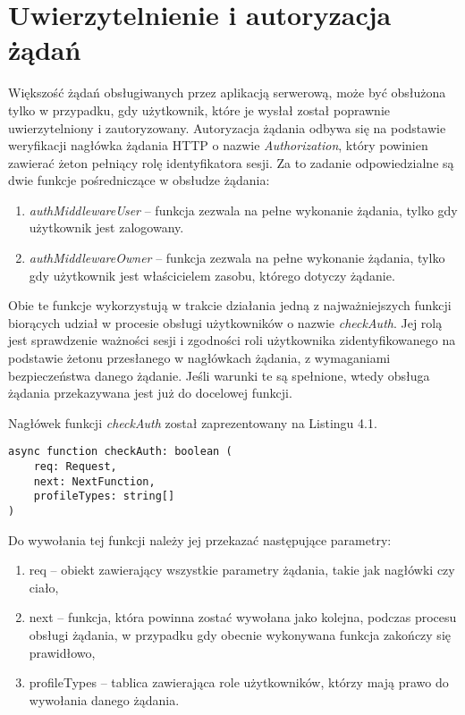 \documentclass[a4paper,12pt,twoside,openany]{report}
\begin{document}
\section{Uwierzytelnienie i autoryzacja żądań}
Większość żądań obsługiwanych przez aplikacją serwerową, może być obsłużona tylko w przypadku, gdy użytkownik, które je wysłał został poprawnie uwierzytelniony i zautoryzowany. 
Autoryzacja żądania odbywa się na podstawie weryfikacji nagłówka żądania HTTP o nazwie \textit{Authorization}, który powinien zawierać żeton pełniący rolę identyfikatora sesji. Za to zadanie odpowiedzialne są dwie funkcje pośredniczące w obsłudze żądania: 
\begin{enumerate}
	
	\item \textit{authMiddlewareUser} -- funkcja zezwala na pełne wykonanie żądania, tylko gdy użytkownik jest zalogowany.
	
	\item \textit{authMiddlewareOwner} -- funkcja zezwala na pełne wykonanie żądania, tylko gdy użytkownik jest właścicielem zasobu, którego dotyczy żądanie.
	
\end{enumerate}

Obie te funkcje wykorzystują w trakcie działania jedną z najważniejszych funkcji biorących udział w procesie obsługi użytkowników o nazwie \textit{checkAuth}. Jej rolą jest sprawdzenie ważności sesji i zgodności roli użytkownika zidentyfikowanego na podstawie żetonu przesłanego w nagłówkach żądania, z wymaganiami bezpieczeństwa danego żądanie. Jeśli warunki te są spełnione, wtedy obsługa żądania przekazywana jest już do docelowej funkcji. 

Nagłówek funkcji \textit{checkAuth} został zaprezentowany na Listingu 4.1.

\begin{lstlisting}[caption=Sygnatura funkcji checkAuth,label=code1,captionpos=b]
async function checkAuth: boolean (
	req: Request,
	next: NextFunction,                        
	profileTypes: string[]
)
\end{lstlisting}



Do wywołania tej funkcji należy jej przekazać następujące parametry:
\begin{enumerate}
	
	\item req -- obiekt zawierający wszystkie parametry żądania, takie jak nagłówki czy ciało,
	
	\item next -- funkcja, która powinna zostać wywołana jako kolejna, podczas procesu obsługi żądania, w przypadku gdy obecnie wykonywana funkcja zakończy się prawidłowo,
	
	\item profileTypes -- tablica zawierająca role użytkowników, którzy mają prawo do wywołania danego żądania.
\end{enumerate}
\end{document}
